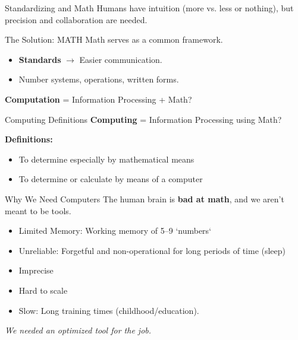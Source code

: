 \documentclass[aspectratio=169]{beamer}
\begin{document}
\begin{frame}{Standardizing and Math}
    Humans have intuition (more vs. less or nothing), but precision and collaboration are needed.

    \begin{alertblock}{The Solution: MATH}
        Math serves as a common framework.
        \begin{itemize}
            \item \textbf{Standards} $\to$ Easier communication.
            \item Number systems, operations, written forms.
        \end{itemize}
    \end{alertblock}

    \vspace{1em}
    \textbf{Computation} = Information Processing + Math?
\end{frame}


\begin{frame}{Computing Definitions}
    \textbf{Computing} = Information Processing using Math?

    \vspace{1em}
    \textbf{Definitions:}
    \begin{itemize}
        \item To determine especially by mathematical means
        \item To determine or calculate by means of a computer
    \end{itemize}
\end{frame}



\begin{frame}{Why We Need Computers}
    The human brain is \textbf{bad at math}, and we aren't meant to be tools.
    \vspace{0.5em}
    \begin{itemize}
        \item \alert{Limited Memory:} Working memory of 5--9 `numbers`
        \item \alert{Unreliable:} Forgetful and non-operational for long periods of time (sleep)
        \item \alert{Imprecise}
        \item \alert{Hard to scale}
        \item \alert{Slow:} Long training times (childhood/education).
    \end{itemize}

    \vspace{1em}
    \centering
    \textit{We needed an optimized tool for the job.}
\end{frame}
\end{document}

